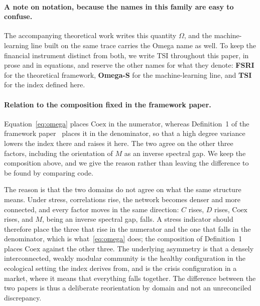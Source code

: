 \documentclass[11pt,a4paper]{article}
\begin{document}
\paragraph{A note on notation, because the names in this family are easy to
confuse.} The accompanying theoretical work writes this quantity $\Omega$, and
the machine-learning line built on the same trace carries the Omega name as
well. To keep the financial instrument distinct from both, we write TSI
throughout this paper, in prose and in equations, and reserve the other names
for what they denote: \textbf{FSRI} for the theoretical framework,
\textbf{Omega-S} for the machine-learning line, and \textbf{TSI} for the index
defined here.

\paragraph{Relation to the composition fixed in the framework paper.}
\label{rem:composition_fin}
Equation~\eqref{eq:omega} places $\mathrm{Coex}$ in the numerator, whereas
Definition~1 of the framework paper~\cite{acedo2026fsri} places it in the
denominator, so that a high degree variance lowers the index there and raises it
here. The two agree on the other three factors, including the orientation of $M$
as an inverse spectral gap. We keep the composition above, and we give the
reason rather than leaving the difference to be found by comparing code.

The reason is that the two domains do not agree on what the same structure
means. Under stress, correlations rise, the network becomes denser and more
connected, and every factor moves in the same direction: $C$ rises, $D$ rises,
$\mathrm{Coex}$ rises, and $M$, being an inverse spectral gap, falls. A
stress indicator should therefore place the three that rise in the numerator and
the one that falls in the denominator, which is what~\eqref{eq:omega} does; the
composition of Definition~1 places $\mathrm{Coex}$ against the other three. The
underlying asymmetry is that a densely interconnected, weakly modular community
is the healthy configuration in the ecological setting the index derives from,
and is the crisis configuration in a market, where it means that everything
falls together. The difference between the two papers is thus a deliberate
reorientation by domain and not an unreconciled discrepancy.
\end{document}
